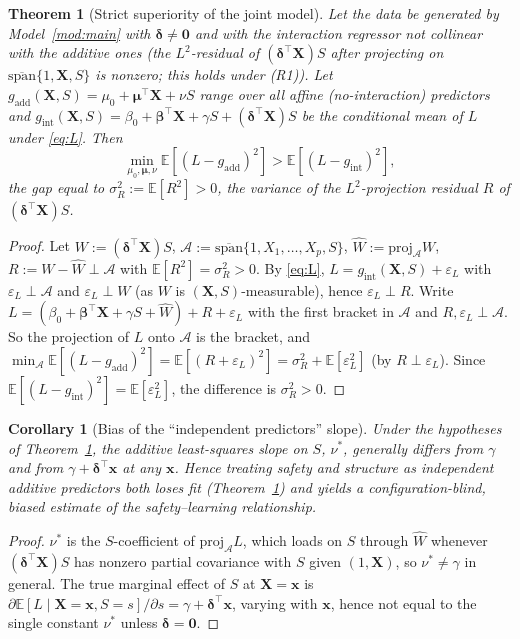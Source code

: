 \documentclass{amsart}
\theoremstyle{definition}
\theoremstyle{plain}
\newtheorem{theorem}{Theorem}
\newtheorem{corollary}{Corollary}
\begin{document}
\begin{theorem}[Strict superiority of the joint model]\label{thm:nonred}
Let the data be generated by Model~\ref{mod:main} with $\bm\delta\neq\bm0$ and with the
interaction regressor not collinear with the additive ones (the $L^2$-residual of
$(\bm\delta^\top\bm X)S$ after projecting on $\overline{\mathrm{span}}\{1,\bm X,S\}$ is
nonzero; this holds under (R1)). Let
$g_{\mathrm{add}}(\bm X,S)=\mu_0+\bm\mu^\top\bm X+\nu S$ range over all affine
(no-interaction) predictors and
$g_{\mathrm{int}}(\bm X,S)=\beta_0+\bm\beta^\top\bm X+\gamma S+(\bm\delta^\top\bm X)S$ be the
conditional mean of $L$ under \eqref{eq:L}. Then
\[
\min_{\mu_0,\bm\mu,\nu}\mathbb E[(L-g_{\mathrm{add}})^2]
>\mathbb E[(L-g_{\mathrm{int}})^2],
\]
the gap equal to $\sigma_R^2:=\mathbb E[R^2]>0$, the variance of the $L^2$-projection
residual $R$ of $(\bm\delta^\top\bm X)S$.
\end{theorem}

\begin{proof}
Let $W:=(\bm\delta^\top\bm X)S$, $\mathcal A:=\overline{\mathrm{span}}\{1,X_1,\dots,X_p,S\}$,
$\hat W:=\mathrm{proj}_{\mathcal A}W$, $R:=W-\hat W\perp\mathcal A$ with
$\mathbb E[R^2]=\sigma_R^2>0$. By \eqref{eq:L},
$L=g_{\mathrm{int}}(\bm X,S)+\varepsilon_L$ with $\varepsilon_L\perp\mathcal A$ and
$\varepsilon_L\perp W$ (as $W$ is $(\bm X,S)$-measurable), hence $\varepsilon_L\perp R$.
Write $L=(\beta_0+\bm\beta^\top\bm X+\gamma S+\hat W)+R+\varepsilon_L$ with the first bracket
in $\mathcal A$ and $R,\varepsilon_L\perp\mathcal A$. So the projection of $L$ onto
$\mathcal A$ is the bracket, and
$\min_{\mathcal A}\mathbb E[(L-g_{\mathrm{add}})^2]=\mathbb E[(R+\varepsilon_L)^2]
=\sigma_R^2+\mathbb E[\varepsilon_L^2]$ (by $R\perp\varepsilon_L$). Since
$\mathbb E[(L-g_{\mathrm{int}})^2]=\mathbb E[\varepsilon_L^2]$, the difference is
$\sigma_R^2>0$.
\end{proof}

\begin{corollary}[Bias of the ``independent predictors'' slope]\label{cor:bias}
Under the hypotheses of Theorem~\ref{thm:nonred}, the additive least-squares slope on $S$,
$\nu^\ast$, generally differs from $\gamma$ and from $\gamma+\bm\delta^\top\bm x$ at any
$\bm x$. Hence treating safety and structure as independent additive predictors both loses
fit (Theorem~\ref{thm:nonred}) and yields a configuration-blind, biased estimate of the
safety--learning relationship.
\end{corollary}
\begin{proof}
$\nu^\ast$ is the $S$-coefficient of $\mathrm{proj}_{\mathcal A}L$, which loads on $S$
through $\hat W$ whenever $(\bm\delta^\top\bm X)S$ has nonzero partial covariance with $S$
given $(1,\bm X)$, so $\nu^\ast\neq\gamma$ in general. The true marginal effect of $S$ at
$\bm X=\bm x$ is $\partial\mathbb E[L\mid\bm X=\bm x,S=s]/\partial s=\gamma+\bm\delta^\top
\bm x$, varying with $\bm x$, hence not equal to the single constant $\nu^\ast$ unless
$\bm\delta=\bm0$.
\end{proof}
\end{document}
